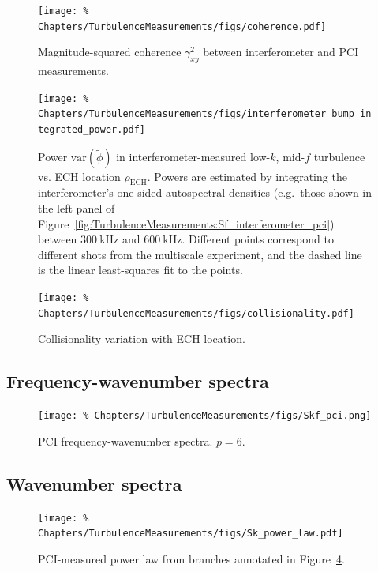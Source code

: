 \begin{figure}
  \centering
  \texttt{[image: \%
    Chapters/TurbulenceMeasurements/figs/coherence.pdf]}
  \caption[Magnitude-squared coherence]{%
    Magnitude-squared coherence $\gamma^2_{xy}$
    between interferometer and PCI measurements.
  }
  \label{fig:TurbulenceMeasurements:gamma2xy}
\end{figure}

\begin{figure}
  \centering
  \texttt{[image: \%
    Chapters/TurbulenceMeasurements/figs/interferometer\_bump\_integrated\_power.pdf]}
  \caption[Power in low-$k$, mid-$f$ turbulence vs. ECH location]{%
    Power $\text{var}(\tilde{\phi})$ in interferometer-measured
    low-$k$, mid-$f$ turbulence vs. ECH location $\rho_{\text{ECH}}$.
    Powers are estimated by integrating the interferometer's
    one-sided autospectral densities
    (e.g.\ those shown in the left panel of
    Figure~\ref{fig:TurbulenceMeasurements:Sf_interferometer_pci})
    between $\SI{300}{\kilo\hertz}$ and $\SI{600}{\kilo\hertz}$.
    Different points correspond to different shots
    from the multiscale experiment, and
    the dashed line is the linear least-squares fit to the points.
  }
\label{fig:TurbulenceMeasurements:interferometer_bump_integrated_power}
\end{figure}

\begin{figure}
  \centering
  \texttt{[image: \%
    Chapters/TurbulenceMeasurements/figs/collisionality.pdf]}
  \caption[Collisionality variation with ECH location]{%
    Collisionality variation with ECH location.
  }
\label{fig:TurbulenceMeasurements:collisionality}
\end{figure}


\subsection{Frequency-wavenumber spectra}
\label{sec:TurbulenceMeasurements:Skf}

\begin{figure}
  \centering
  \texttt{[image: \%
    Chapters/TurbulenceMeasurements/figs/Skf\_pci.png]}
  \caption[PCI frequency-wavenumber spectra]{%
    PCI frequency-wavenumber spectra. $p = 6$.
  }
\label{fig:TurbulenceMeasurements:Skf_pci}
\end{figure}


\subsection{Wavenumber spectra}
\label{sec:TurbulenceMeasurements:Sk}
\begin{figure}
  \centering
  \texttt{[image: \%
    Chapters/TurbulenceMeasurements/figs/Sk\_power\_law.pdf]}
  \caption[PCI-measured power law]{%
    PCI-measured power law from branches annotated in
    Figure~\ref{fig:TurbulenceMeasurements:Skf_pci}.
  }
\label{fig:TurbulenceMeasurements:Sk_power_law}
\end{figure}


